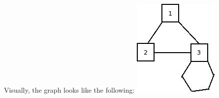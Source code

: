 \documentclass[12pt]{book}
\begin{document}
Visually, the graph looks like the following:
\includegraphics[width=.9\linewidth]{./pic/clonegraph.jpg}
\end{document}
